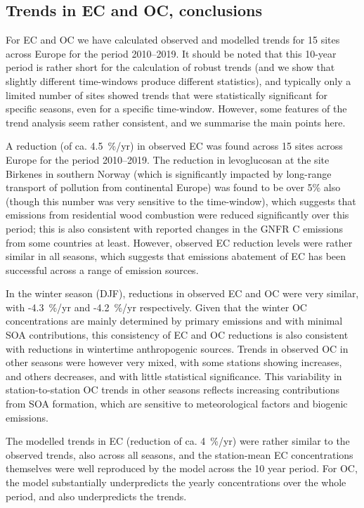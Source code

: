 \subsection{Trends in EC and OC, conclusions}
\label{ss:trendsECOCconc}

For EC and OC we have calculated observed and modelled trends for 15 sites across Europe for the period 2010--2019. It should be noted that this 10-year period is rather short for the calculation of robust trends (and we show that slightly different time-windows produce different statistics), and typically only a limited number of sites showed trends that were statistically significant for specific seasons, even for a specific time-window. However, some features of the trend analysis seem rather consistent, and we summarise the main points here. 

A reduction (of ca. 4.5~\%/yr) in observed EC was found across 15 sites across Europe for the  period 
2010--2019. The reduction in levoglucosan at the site Birkenes in southern Norway (which is significantly impacted by long-range transport of pollution from continental Europe) was found to be over 5\% also (though this number was very sensitive to the time-window), which suggests that emissions from residential wood combustion were reduced significantly over this period; this is also consistent with reported changes in the GNFR C emissions from some countries at least. However, observed EC reduction levels were rather similar in all seasons, which suggests that emissions abatement of EC has been successful across a range of emission sources. 

In the winter season (DJF), reductions in observed EC and OC were very similar, with \mbox{-4.3~\%/yr} and -4.2~\%/yr respectively. Given that the winter OC concentrations are mainly determined by primary emissions and with minimal SOA contributions, this consistency of EC and OC reductions is also consistent with reductions in wintertime anthropogenic sources. Trends in observed OC in other seasons were however very mixed, with some stations showing increases, and others decreases, and with little statistical significance. This variability in station-to-station OC trends in other seasons reflects increasing contributions from SOA formation, which are sensitive to meteorological factors and biogenic emissions.

The modelled trends in EC (reduction of ca. 4~\%/yr) were rather similar to the observed trends, also across all seasons, and the station-mean EC concentrations themselves were well reproduced by the model across the 10 year period. 
For OC, the model substantially underpredicts the yearly concentrations over the whole period, and also underpredicts the trends.  

